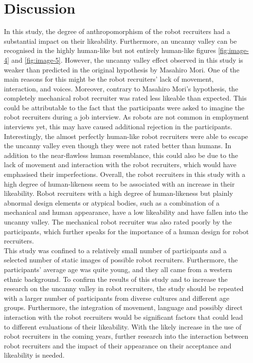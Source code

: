 \section{Discussion}
In this study, the degree of anthropomorphism of the robot recruiters had a substantial impact on their likeability. Furthermore, an uncanny valley can be recognised in the highly human-like but not entirely human-like figures \ref{fig:image-4} and \ref{fig:image-5}. However, the uncanny valley effect observed in this study is weaker than predicted in the original hypothesis by Masahiro Mori. One of the main reasons for this might be the robot recruiters' lack of movement, interaction, and voices. Moreover, contrary to Masahiro Mori's hypothesis, the completely mechanical robot recruiter was rated less likeable than expected. This could be attributable to the fact that the participants were asked to imagine the robot recruiters during a job interview. As robots are not common in employment interviews yet, this may have caused additional rejection in the participants.
Interestingly, the almost perfectly human-like robot recruiters were able to escape the uncanny valley even though they were not rated better than humans. In addition to the near-flawless human resemblance, this could also be due to the lack of movement and interaction with the robot recruiters, which would have emphasised their imperfections. 
Overall, the robot recruiters in this study with a high degree of human-likeness seem to be  associated with an increase in their likeability. Robot recruiters with a high degree of human-likeness but plainly abnormal design elements or atypical bodies, such as a combination of a mechanical and human appearance, have a low likeability and have fallen into the uncanny valley.
The mechanical robot recruiter was also rated poorly by the participants, which further speaks for the importance of a human design for robot recruiters.\\
This study was confined to a relatively small number of participants and a selected number of static images of possible robot recruiters. Furthermore, the participants' average age was quite young, and they all came from a western ethnic background. To confirm the results of this study and to increase the research on the uncanny valley in robot recruiters, the study should be repeated with a larger number of participants from diverse cultures and different age groups.
Furthermore, the integration of movement, language and possibly direct interaction with the robot recruiters would be significant factors that could lead to different evaluations of their likeability. With the likely increase in the use of robot recruiters in the coming years, further research into the interaction between robot recruiters and the impact of their appearance on their acceptance and likeability is needed. 